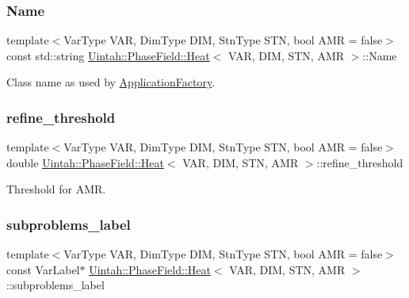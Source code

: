 \subsubsection{\texorpdfstring{Name}{Name}}
{\footnotesize\ttfamily template$<$Var\+Type V\+AR, Dim\+Type D\+IM, Stn\+Type S\+TN, bool A\+MR = false$>$ \\
const std\+::string \hyperlink{classUintah_1_1PhaseField_1_1Heat}{Uintah\+::\+Phase\+Field\+::\+Heat}$<$ V\+AR, D\+IM, S\+TN, A\+MR $>$\+::Name\hspace{0.3cm}{\ttfamily [static]}}



Class name as used by \hyperlink{classUintah_1_1PhaseField_1_1ApplicationFactory}{Application\+Factory}. 

\mbox{\label{classUintah_1_1PhaseField_1_1Heat_aff3739ebcad41c592dcdb5a92b6abb52}} 
\subsubsection{\texorpdfstring{refine\+\_\+threshold}{refine\_threshold}}
{\footnotesize\ttfamily template$<$Var\+Type V\+AR, Dim\+Type D\+IM, Stn\+Type S\+TN, bool A\+MR = false$>$ \\
double \hyperlink{classUintah_1_1PhaseField_1_1Heat}{Uintah\+::\+Phase\+Field\+::\+Heat}$<$ V\+AR, D\+IM, S\+TN, A\+MR $>$\+::refine\+\_\+threshold\hspace{0.3cm}{\ttfamily [protected]}}



Threshold for A\+MR. 

\mbox{\label{classUintah_1_1PhaseField_1_1Heat_a1305118ea9f1abeff12771589bca3ef9}} 
\subsubsection{\texorpdfstring{subproblems\+\_\+label}{subproblems\_label}}
{\footnotesize\ttfamily template$<$Var\+Type V\+AR, Dim\+Type D\+IM, Stn\+Type S\+TN, bool A\+MR = false$>$ \\
const Var\+Label$\ast$ \hyperlink{classUintah_1_1PhaseField_1_1Heat}{Uintah\+::\+Phase\+Field\+::\+Heat}$<$ V\+AR, D\+IM, S\+TN, A\+MR $>$\+::subproblems\+\_\+label\hspace{0.3cm}{\ttfamily [protected]}}

